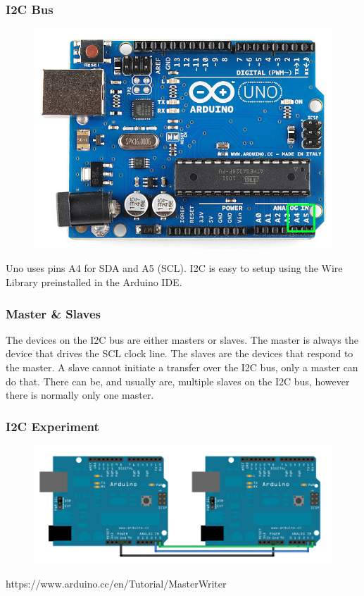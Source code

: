 \begin{frame}
	\frametitle{I2C Bus}
	\begin{figure}
		\includegraphics[scale=.35]{assets/i2carduino}  
	\end{figure}
	
	Uno uses pins A4 for SDA and A5 (SCL).
	I2C is easy to setup using the Wire Library preinstalled in the Arduino IDE.
\end{frame}


\begin{frame}
	\frametitle{Master \& Slaves}
The devices on the I2C bus are either masters or slaves. The master is always the device that drives the SCL clock line. The slaves are the devices that respond to the master. A slave cannot initiate a transfer over the I2C bus, only a master can do that. There can be, and usually are, multiple slaves on the I2C bus, however there is normally only one master.
\end{frame}

\begin{frame}
	\frametitle{I2C Experiment}
	\begin{figure}
		\includegraphics[scale=.2]{assets/arduino2arduino}  
	\end{figure}
	https://www.arduino.cc/en/Tutorial/MasterWriter
\end{frame}

